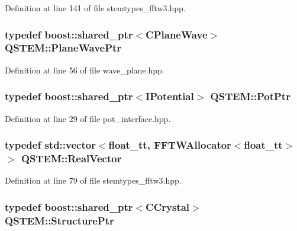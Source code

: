 Definition at line 141 of file stemtypes\-\_\-fftw3.\-hpp.

\hypertarget{namespace_q_s_t_e_m_a1bc6587692685d5942570cc15571fe14}{
\subsubsection[{Plane\-Wave\-Ptr}]{\setlength{\rightskip}{0pt plus 5cm}typedef boost\-::shared\-\_\-ptr$<${\bf C\-Plane\-Wave}$>$ {\bf Q\-S\-T\-E\-M\-::\-Plane\-Wave\-Ptr}}}\label{namespace_q_s_t_e_m_a1bc6587692685d5942570cc15571fe14}


Definition at line 56 of file wave\-\_\-plane.\-hpp.

\hypertarget{namespace_q_s_t_e_m_ae5a1cfb98b70a68e1c9b3fd1f50ab4b5}{
\subsubsection[{Pot\-Ptr}]{\setlength{\rightskip}{0pt plus 5cm}typedef boost\-::shared\-\_\-ptr$<${\bf I\-Potential}$>$ {\bf Q\-S\-T\-E\-M\-::\-Pot\-Ptr}}}\label{namespace_q_s_t_e_m_ae5a1cfb98b70a68e1c9b3fd1f50ab4b5}


Definition at line 29 of file pot\-\_\-interface.\-hpp.

\hypertarget{namespace_q_s_t_e_m_a8dfe9e1dbecce3838cb082d96e991ba7}{
\subsubsection[{Real\-Vector}]{\setlength{\rightskip}{0pt plus 5cm}typedef {\bf std\-::vector}$<${\bf float\-\_\-tt}, {\bf F\-F\-T\-W\-Allocator}$<${\bf float\-\_\-tt}$>$ $>$ {\bf Q\-S\-T\-E\-M\-::\-Real\-Vector}}}\label{namespace_q_s_t_e_m_a8dfe9e1dbecce3838cb082d96e991ba7}


Definition at line 79 of file stemtypes\-\_\-fftw3.\-hpp.

\hypertarget{namespace_q_s_t_e_m_a7ab0b6bb11e12c9829540e6d872946fc}{
\subsubsection[{Structure\-Ptr}]{\setlength{\rightskip}{0pt plus 5cm}typedef boost\-::shared\-\_\-ptr$<${\bf C\-Crystal}$>$ {\bf Q\-S\-T\-E\-M\-::\-Structure\-Ptr}}}\label{namespace_q_s_t_e_m_a7ab0b6bb11e12c9829540e6d872946fc}


